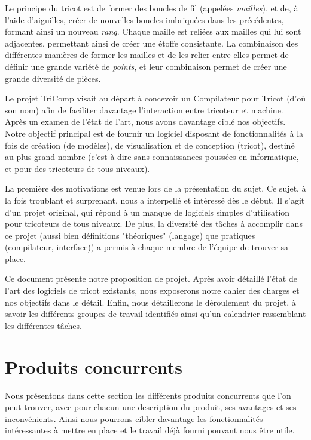 \documentclass{article}
\begin{document}
Le principe du tricot est de former des boucles de fil (appelées \emph{mailles}), et de, à l'aide d'aiguilles, créer de nouvelles boucles
imbriquées dans les précédentes, formant ainsi un nouveau \emph{rang}. Chaque maille est reliées aux mailles qui lui sont adjacentes,
permettant ainsi de créer une étoffe consistante. La combinaison des différentes manières de former les mailles et de les relier entre elles
permet de définir une grande variété de \emph{points}, et leur combinaison permet de créer une grande diversité de pièces.

Le projet TriComp visait au départ à concevoir un Compilateur pour Tricot (d'où son nom) afin de faciliter davantage l'interaction entre
tricoteur et machine. Après un examen de l'état de l'art, nous avons davantage ciblé nos objectifs. Notre objectif principal est de
fournir un logiciel disposant de fonctionnalités à la fois de création (de modèles), de visualisation et de conception (tricot),
destiné au plus grand nombre (c'est-à-dire sans connaissances poussées en informatique, et pour des tricoteurs de tous niveaux).

La première des motivations est venue lors de la présentation du sujet. Ce sujet, à la fois troublant et surprenant, nous a interpellé et
intéressé dès le début. Il s'agit d'un projet original, qui répond à un manque de logiciels simples d'utilisation pour tricoteurs de tous
niveaux. De plus, la diversité des tâches à accomplir dans ce projet (aussi bien définitions "théoriques" (langage) que pratiques
(compilateur, interface)) a permis à chaque membre de l'équipe de trouver sa place.

Ce document présente notre proposition de projet. Après avoir détaillé l'état de l'art des logiciels de tricot existants, nous exposerons
notre cahier des charges et nos objectifs dans le détail. Enfin, nous détaillerons le déroulement du projet, à savoir les différents
groupes de travail identifiés ainsi qu'un calendrier rassemblant les différentes tâches.



\section{Produits concurrents}

Nous présentons dans cette section les différents produits concurrents que l'on peut trouver, avec pour chacun une description du produit,
ses avantages et ses inconvénients. Ainsi nous pourrons cibler davantage les fonctionnalités intéressantes à mettre en place et le
travail déjà fourni pouvant nous être utile.
\end{document}
